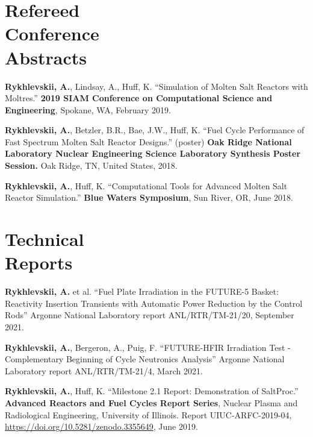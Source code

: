 \documentclass[margin,line]{resume}
\begin{document}
\begin{resume}
    \section{\mysidestyle Refereed\\Conference\\Abstracts}
    \begin{bibenum} 
    \item \textbf{Rykhlevskii, A.}, Lindsay, A., Huff, K. ``Simulation of Molten Salt Reactors with Moltres.'' \textbf{2019 SIAM Conference on Computational Science and Engineering}, 
            Spokane, WA, February 2019.
	\item \textbf{Rykhlevskii, A.}, Betzler, B.R., Bae, J.W., Huff, K. ``Fuel Cycle Performance of Fast Spectrum Molten Salt Reactor Designs.'' (poster)
            \textbf{Oak Ridge National Laboratory Nuclear Engineering Science Laboratory Synthesis Poster Session.} 
            Oak Ridge, TN, United States, 2018.
    \item \textbf{Rykhlevskii, A.}, Huff, K. ``Computational Tools for Advanced 
            Molten Salt Reactor Simulation.'' \textbf{Blue Waters Symposium}, 
            Sun River, OR, June 2018.
	\end{bibenum}
\section{\mysidestyle Technical\\Reports}
\begin{bibenum} 
	\item \textbf{Rykhlevskii, A.} et al. ``Fuel Plate Irradiation
	in the FUTURE-5 Basket: Reactivity Insertion Transients with
	Automatic Power Reduction by the Control Rods''
	Argonne National Laboratory report ANL/RTR/TM-21/20, September 2021.
	\item \textbf{Rykhlevskii, A.}, Bergeron, A., Puig, F. ``FUTURE-HFIR 
	Irradiation Test - Complementary Beginning of Cycle Neutronics Analysis''
	Argonne National Laboratory report ANL/RTR/TM-21/4, March 2021.
	\item \textbf{Rykhlevskii, A.}, Huff, K. ``Milestone 2.1 Report: 
	Demonstration of 
	SaltProc.'' \textbf{Advanced Reactors and Fuel Cycles Report Series}, 
	Nuclear Plasma and Radiological Engineering, University of Illinois.  
	Report UIUC-ARFC-2019-04, \url{https://doi.org/10.5281/zenodo.3355649}, 
	June 2019.
\end{bibenum}

\end{resume}
\end{document}
